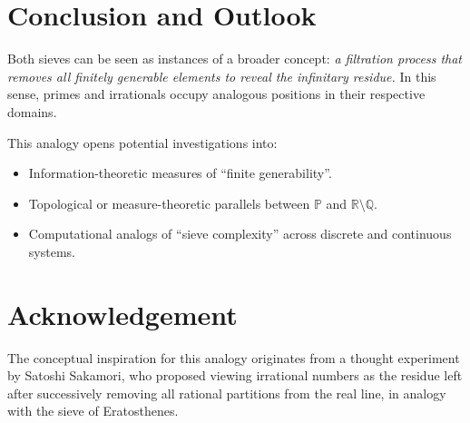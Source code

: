 \documentclass[11pt]{article}
\begin{document}
\section{Conclusion and Outlook}

Both sieves can be seen as instances of a broader concept: 
\textit{a filtration process that removes all finitely generable elements 
to reveal the infinitary residue.}
In this sense, primes and irrationals occupy analogous positions 
in their respective domains.

This analogy opens potential investigations into:
\begin{itemize}
    \item Information-theoretic measures of ``finite generability''.
    \item Topological or measure-theoretic parallels between 
          $\mathbb{P}$ and $\mathbb{R}\setminus\mathbb{Q}$.
    \item Computational analogs of ``sieve complexity'' 
          across discrete and continuous systems.
\end{itemize}

\section*{Acknowledgement}

The conceptual inspiration for this analogy originates from 
a thought experiment by Satoshi Sakamori, 
who proposed viewing irrational numbers as the residue left after 
successively removing all rational partitions from the real line, 
in analogy with the sieve of Eratosthenes.
\end{document}
